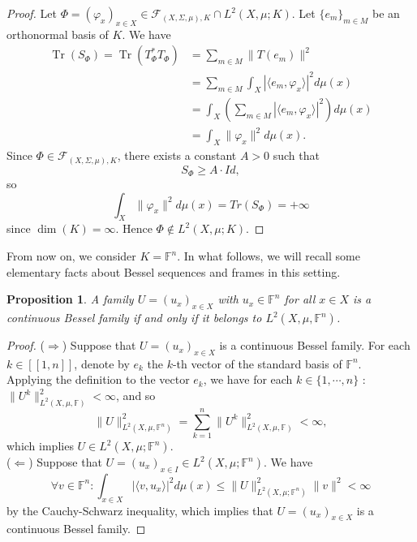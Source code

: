 \documentclass[a4paper,12pt]{article}
\DeclareMathOperator{\Tr}{Tr}
\theoremstyle{plain}
\newtheorem{proposition}{Proposition}[section]
\theoremstyle{definition}
\theoremstyle{remark}
\begin{document}
\begin{proof}
Let $\Phi = (\varphi_x)_{x \in X} \in \mathcal{F}_{(X,\Sigma,\mu),K} \cap L^2(X,\mu;K)$. Let $\{e_m\}_{m \in M}$ be an orthonormal basis of $K$. We have
\begin{align*} 
\Tr(S_\Phi) = \Tr(T_\Phi^*T_\Phi) &= \sum_{m \in M} \|T(e_m) \|^2 \\
&= \sum_{m \in M} \int_X | \langle e_m , \varphi_x \rangle |^2 d\mu(x) \\
&= \int_X \left( \sum_{m \in M} | \langle e_m , \varphi_x \rangle |^2 \right) d\mu(x) \\
&= \int_X \| \varphi_x \|^2 d\mu(x).
\end{align*}
Since $\Phi \in \mathcal{F}_{(X,\Sigma,\mu),K}$, there exists a constant $A>0$ such that 
\[ S_\Phi \geq A \cdot Id, \]
so 
\[ \int_X \| \varphi_x \|^2 d\mu(x) = Tr(S_\Phi) = +\infty \]
since $\dim(K)=\infty$. Hence $\Phi \notin L^2(X,\mu;K)$.
\end{proof}
From now on, we consider $K = \mathbb{F}^n$. In what follows, we will recall some elementary facts about Bessel sequences and frames in this setting.

\begin{proposition} 
A family $U = (u_x)_{x \in X}$ with $u_x \in \mathbb{F}^n$ for all $x \in X$ is a continuous Bessel family if and only if it belongs to $L^2(X,\mu,\mathbb{F}^n)$.
\label{PropBesselL2Ck}
\end{proposition}

\begin{proof}
($\Rightarrow$) Suppose that $U = (u_x)_{x \in X}$ is a continuous Bessel family. For each $k \in [\![1,n]\!]$, denote by $e_k$ the $k$-th vector of the standard basis of $\mathbb{F}^n$. \\
Applying the definition to the vector $e_k$, we have for each $k \in \{1, \cdots, n\}$ : $\| U^k \|_{L^2(X,\mu,\mathbb{F})}^2 < \infty$, and so
\[ \| U \|_{L^2(X,\mu,\mathbb{F}^n)}^2 = \sum_{k=1}^n \| U^k \|_{L^2(X,\mu,\mathbb{F})}^2 < \infty, \]
which implies $U \in L^2(X,\mu;\mathbb{F}^n)$. \\
($\Leftarrow$) Suppose that $U = (u_x)_{x \in I} \in L^2(X,\mu;\mathbb{F}^n)$. We have
\[ \forall v \in \mathbb{F}^n : \int_{x \in X} |\langle v , u_x \rangle |^2 d\mu(x) \leq \| U \|_{L^2(X,\mu;\mathbb{F}^n)}^2 \lVert v \rVert^2 < \infty \]
by the Cauchy-Schwarz inequality, which implies that $U = (u_x)_{x \in X}$ is a continuous Bessel family.
\end{proof}
\end{document}

